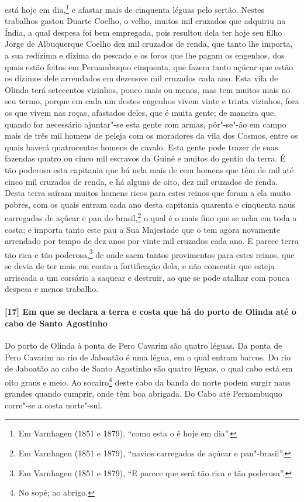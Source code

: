 está hoje em dia,\footnote{ Em Varnhagen (1851 e 1879), ``como esta o é hoje em dia''.} e
afastar mais de cinquenta léguas pelo sertão. Nestes trabalhos gastou Duarte Coelho, o
velho, muitos mil cruzados que adquiriu na Índia, a qual despesa foi bem empregada, pois
resultou dela ter hoje seu filho Jorge de Albuquerque Coelho dez mil cruzados de renda,
que tanto lhe importa, a sua redízima e dízima do pescado e os foros que lhe pagam os
engenhos, dos quais estão feitos em Pernambuquo cinquenta, que fazem tanto açúcar que
estão os dízimos dele arrendados em dezenove mil cruzados cada ano. Esta vila de Olinda
terá setecentos vizinhos, pouco mais ou menos, mas tem muitos mais no seu termo, porque em
cada um destes engenhos vivem vinte e trinta vizinhos, fora os que vivem nas roças,
afastados deles, que é muita gente; de maneira que, quando for necessário ajuntar"-se esta
gente com armas, pôr"-se"-ão em campo mais de três mil homens de peleja com os moradores da
vila dos Cosmos, entre os quais haverá quatrocentos homens de cavalo. Esta gente pode
trazer de suas fazendas quatro ou cinco mil escravos da Guiné e muitos do gentio da terra.
É tão poderosa esta capitania que há nela mais de cem homens que têm de mil até cinco mil
cruzados de renda, e há alguns de oito, dez mil cruzados de renda. Desta terra saíram
muitos homens ricos para estes reinos que foram a ela muito pobres, com os quais entram
cada ano desta capitania quarenta e cinquenta naus carregadas de açúcar e pau do
brasil,\footnote{ Em Varnhagen (1851 e 1879), ``navios carregados de açúcar e
pau"-brasil''.} o qual é o mais fino que se acha em toda a costa; e importa tanto este pau
a Sua Majestade que o tem agora novamente arrendado por tempo de dez anos por vinte mil
cruzados cada ano. E parece terra tão rica e tão poderosa,\footnote{ Em Varnhagen (1851 e
1879), ``E parece que será tão rica e tão poderosa''.} de onde saem tantos provimentos
para estes reinos, que se devia de ter mais em conta a fortificação dela, e não consentir
que esteja arriscada a um corsário a saquear e destruir, ao que se pode atalhar com pouca
despesa e menos trabalho.

\paragraph{[17] Em que se declara a terra e costa que há do porto de Olinda até o cabo de
Santo Agostinho} \quad
Do porto de Olinda à ponta de Pero Cavarim são quatro léguas. Da ponta de Pero Cavarim ao
rio de Jaboatão é uma légua, em o qual entram barcos. Do rio de Jaboatão ao cabo de Santo
Agostinho são quatro léguas, o qual cabo está em oito graus e meio. Ao socairo\footnote{
No sopé; ao abrigo.} deste cabo da banda do norte podem surgir naus grandes quando
cumprir, onde têm boa abrigada. Do Cabo até Pernambuquo corre"-se a costa norte"-sul.

